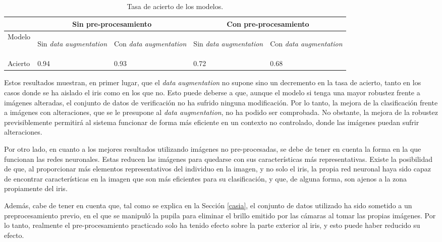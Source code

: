 \begin{table}[h!]
\begin{tabular}{ |p{1.2cm}||p{2.3cm}|p{2.3cm}|p{2.3cm}|p{2.3cm}|  }
    \hline
     & \multicolumn{2}{|c|}{Sin pre-procesamiento} & \multicolumn{2}{|c|}{Con pre-procesamiento} \\
    \hline
    Modelo& \begin{footnotesize}Sin \textit{data \newline augmentation}\end{footnotesize} & \begin{footnotesize}Con \textit{data \newline augmentation}\end{footnotesize} & \begin{footnotesize}Sin \textit{data \newline augmentation}\end{footnotesize}& \begin{footnotesize}Con \textit{data \newline augmentation}\end{footnotesize}\\
    \hline
    Acierto & 0.94   & 0.93    & 0.72 &   0.68\\
    \hline
   \end{tabular}
   \caption{\label{tabla:tasa-acierto-modelos}Tasa de acierto de los modelos.}
\end{table}


Estos resultados muestran, en primer lugar, que el \textit{data augmentation} no supone sino un decremento en la tasa de acierto, tanto en los casos donde se ha aislado el iris
como en los que no. Esto puede deberse a que, aunque el modelo si tenga una mayor robustez frente a imágenes alteradas, el conjunto de datos de verificación no ha sufrido ninguna modificación.
Por lo tanto, la mejora de la clasificación frente a imágenes con alteraciones, que se le presupone al \textit{data augmentation}, no ha podido ser comprobada. No obstante, la mejora de la robustez previsiblemente
permitirá al sistema funcionar de forma más eficiente en un contexto no controlado, donde las imágenes puedan sufrir alteraciones.

Por otro lado, en cuanto a los mejores resultados utilizando imágenes no pre-procesadas, se debe de tener en cuenta la forma en la que funcionan las redes neuronales. 
Estas reducen las imágenes para quedarse con sus características más representativas. Existe la posibilidad de que, al proporcionar más elementos representativos del individuo en la imagen,
y no solo el iris, la propia red neuronal haya sido capaz de encontrar características en la imagen que son más eficientes para su clasificación, y que, de alguna forma, son
ajenos a la zona propiamente del iris.

Además, cabe de tener en cuenta que, tal como se explica en la Sección \ref{casia}, el conjunto de datos utilizado ha sido sometido a un preprocesamiento previo, en el que se manipuló la pupila 
para eliminar el brillo emitido por las cámaras al tomar las propias imágenes. Por lo tanto, realmente el pre-procesamiento practicado solo ha tenido efecto sobre la  
parte exterior al iris, y esto puede haber reducido su efecto.

